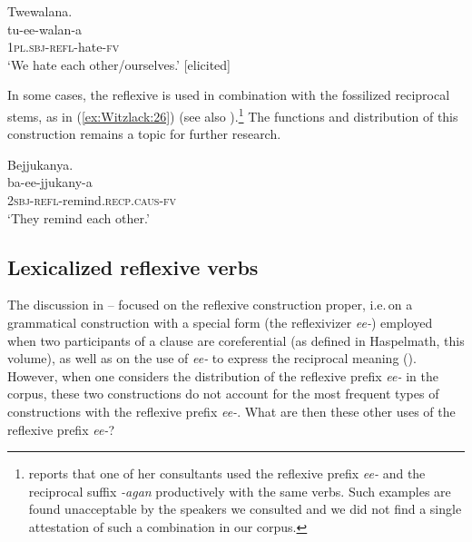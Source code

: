 \documentclass[output=paper,colorlinks,citecolor=brown,
]{langscibook}
\begin{document}
\ex \label{ex:Witzlack:25b}
    \glll Twewalana.\\
    tu-ee-walan-a\\
    \textsc{1pl.sbj}-\textsc{refl}-hate-\textsc{fv}\\
    \glt ‘We hate each other/ourselves.’ [elicited]
\z
\z

In some cases, the reflexive is used in combination with the fossilized reciprocal stems, as in (\ref{ex:Witzlack:26}) (see also \citealt[122]{Murphy1972}).\footnote{\citet[46]{McPherson2008Descriptive} reports that one of her consultants used the reflexive prefix \emph{ee-} and the reciprocal suffix \emph{-agan} productively with the same verbs. 
Such examples are found unacceptable by the speakers we consulted and we did not find a single attestation of such a combination in our corpus.}
The functions and distribution of this construction remains a topic for further research. 

\ea
\label{ex:Witzlack:26}
 
\glll Bejjukanya.\\
ba-ee-jjukany-a\\
\textsc{2sbj}-\textsc{refl}-remind.\textsc{recp.caus-fv}\\
\glt ‘They remind each other.’ %

\z


\subsection{Lexicalized reflexive verbs}\label{sec:Witzlack:7.2}

The discussion in – focused on the reflexive construction proper, i.e.\,on a grammatical construction with a special form (the reflexivizer \emph{ee-}) employed when two participants of a clause are coreferential (as defined in Haspelmath, this volume), as well as on the use of \emph{ee-} to express the reciprocal meaning (). 
However, when one considers the distribution of the reflexive prefix \emph{ee-} in the corpus, these two constructions do not account for the most frequent types of constructions with the reflexive prefix \emph{ee-}. 
What are then these other uses of the reflexive prefix \emph{ee-}? 
\end{document}
